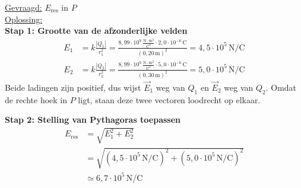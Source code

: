 \documentclass{ximera}
\begin{document}
\begin{exercise}
\begin{solution}
        \underline{Gevraagd:} $E_{\text{res}}$ in $P$\\

        \underline{Oplossing:}\\
        \textbf{Stap 1: Grootte van de afzonderlijke velden}
        \begin{align*}
            E_{1} &= k \frac{|Q_{1}|}{r_{1}^{2}} = \frac{8{,}99 \cdot 10^{9} \, \mathrm{\frac{N \cdot m^2}{C^2}} \cdot 2{,}0 \cdot 10^{-6} \, \mathrm{C}}{(0{,}20 \, \mathrm{m})^{2}} = 4{,}5 \cdot 10^{5} \, \mathrm{N/C} \\
            E_{2} &= k \frac{|Q_{2}|}{r_{2}^{2}} = \frac{8{,}99 \cdot 10^{9} \, \mathrm{\frac{N \cdot m^2}{C^2}} \cdot 5{,}0 \cdot 10^{-6} \, \mathrm{C}}{(0{,}30 \, \mathrm{m})^{2}} = 5{,}0 \cdot 10^{5} \, \mathrm{N/C}
        \end{align*}
        Beide ladingen zijn positief, dus wijst $\vec{E}_1$ weg van $Q_1$ en $\vec{E}_2$ weg van $Q_2$. Omdat de rechte hoek in $P$ ligt, staan deze twee vectoren loodrecht op elkaar.

        \textbf{Stap 2: Stelling van Pythagoras toepassen}
        \begin{align*}
            E_{\text{res}} &= \sqrt{E_1^{2} + E_2^{2}} \\
                            &= \sqrt{(4{,}5 \cdot 10^{5} \, \mathrm{N/C})^{2} + (5{,}0 \cdot 10^{5} \, \mathrm{N/C})^{2}} \\
                            &\simeq \boxed{6{,}7 \cdot 10^{5} \, \mathrm{N/C}}
        \end{align*}
    \end{solution}
\end{exercise}
\end{document}
